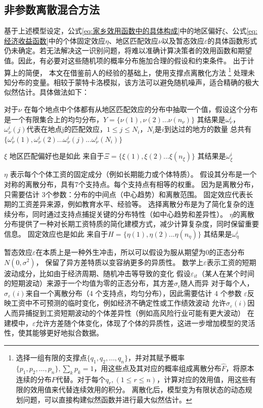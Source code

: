 \documentclass[a4paper,12pt,oneside]{book} %
\begin{document}
\subsection{非参数离散混合方法} 

基于上述模型设定，公式\ref{eq:家乡效用函数中的具体构成}中的地区偏好$\xi$、公式\ref{eq:经济收益函数}中的个体固定效应$\eta$、地区匹配效应$\nu$以及暂态效应$\varepsilon$的具体函数形式仍未确定。若无法解决这一识别问题，将难以准确计算决策者的效用函数和期望值。因此，有必要对这些随机项的概率分布施加合理的假设和约束条件。
出于计算上的简便，
本文在借鉴前人的经验的基础上，使用支撑点离散化方法
\footnote{
选择一组有限的支撑点$\{q_1,q_2,\ldots,q_n\}$，并对其赋予概率$\{p_1,p_2,\ldots,p_n\}, \sum\limits_{k}^{}p_k=1$，用这些点及其对应的概率组成离散分布$\hat F$，将原本连续的分布$F$代替。对于每个$q_r, (1\leqslant r \leqslant n )$，计算对应的效用值，用这些有限的效用值来代替连续效用的积分。
离散化后，模型变为有限状态的动态规划问题，可以直接构建似然函数并进行最大似然估计。
}
处理未知分布的变量。相较于蒙特卡洛模拟，该方法可以避免随机噪声，适合精确的极大似然估计。具体做法如下：

对于$\nu$
在每个地点中个体都有从地区匹配效应的分布中抽取一个值，假设这个分布是一个有限集合上的均匀分布，$Y=\{\nu(1),\nu(2)...\nu(n_{\nu})\}$
其结果是$\omega^{i}_{\nu}$，$\omega^{i}_{\nu}(j)$代表在地点j的匹配效应，$1\leqslant j\leqslant N_i$，$N_i$是$i$到达过的地方的数量
总共有$\{\omega^{i}_{\nu}(1),\omega^{i}_{\nu}(2)...\omega^{i}_{\nu}(j)...\omega^{i}_{\nu}(N_i)\}$

$\xi$
地区匹配偏好也是如此
来自于$\Xi=\{\xi(1),\xi(2)...\xi(n_{\xi})\}$
其结果是$\omega^{i}_{\xi}$

$\eta$ 表示每个个体工资的固定成分（例如长期能力或个体特质）。
假设其分布是一个对称的离散分布，具有7个支持点。每个支持点有相等的权重。
因为是离散分布，只需要估计 3个参数：分布的中间点（中心趋势）和离散范围。
固定效应代表长期的工资差异来源，例如教育水平、经验等。
选择离散分布是为了简化复杂的连续分布，同时通过支持点捕捉关键的分布特性（如中心趋势和差异性）。
$\eta$的离散分布提供了一种对长期工资特质的简化建模方式，减少计算复杂度，同时保留重要信息。
固定效应也是如此
来自于$H=\{\eta(1),\eta(2)...\eta(n_\eta)\}$
其结果是$\omega^{i}_{\eta}$


暂态效应$\varepsilon$在本质上是一种外生冲击，所以可以假设为服从期望为$0$的正态分布$N(0,\sigma^2)$，
保留了异方差特质以变容纳更多的异质性。
数学上$\varepsilon$表示工资的短期波动成分，比如由于经济周期、随机冲击等导致的变化
假设$\varepsilon_{it}$（某人在某个时间的短期波动）来源于一个均值为零的正态分布，其方差$\sigma_{\epsilon}$随人而异
对于每个人，$\sigma_\varepsilon(i)$来自一个离散分布（4 个支持点，均匀分布），因此需要估计 4 个参数
$\varepsilon$反映工资中不可预测的临时变化，例如经济不确定性或工作绩效波动
允许$\sigma_\varepsilon(i)$因人而异捕捉到工资短期波动的个体差异性（例如高风险行业可能有更大波动）
在建模中，$\varepsilon$允许方差随个体变化，体现了个体的异质性，这进一步增加模型的灵活性，使其能够更好地拟合数据。
\end{document}
